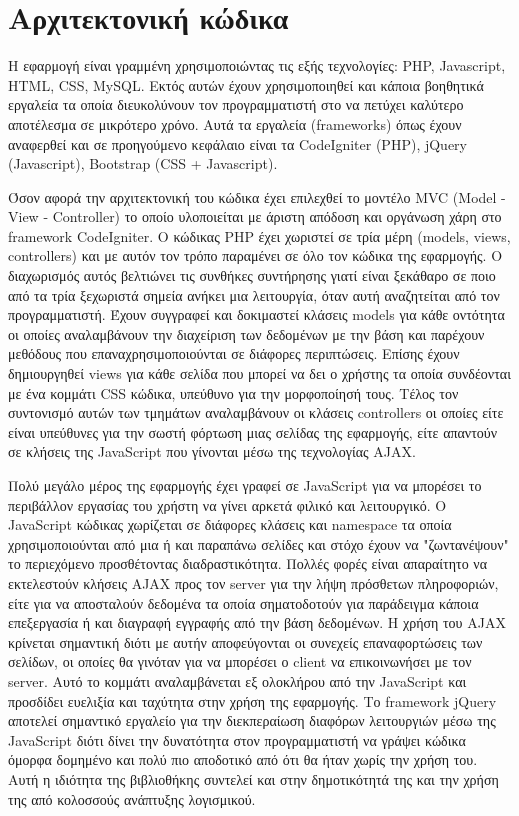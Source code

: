 

\section{Αρχιτεκτονική κώδικα}
Η εφαρμογή είναι γραμμένη χρησιμοποιώντας τις εξής τεχνολογίες: PHP, Javascript, HTML, CSS, MySQL. Εκτός αυτών έχουν χρησιμοποιηθεί και κάποια βοηθητικά εργαλεία τα οποία διευκολύνουν τον προγραμματιστή στο να πετύχει καλύτερο αποτέλεσμα σε μικρότερο χρόνο. Αυτά τα εργαλεία (frameworks) όπως έχουν αναφερθεί και σε προηγούμενο κεφάλαιο είναι τα CodeIgniter (PHP), jQuery (Javascript), Bootstrap (CSS + Javascript). 

Όσον αφορά την αρχιτεκτονική του κώδικα έχει επιλεχθεί το μοντέλο MVC (Model - View - Controller) το οποίο υλοποιείται με άριστη απόδοση και οργάνωση χάρη στο framework CodeIgniter. Ο κώδικας PHP έχει χωριστεί σε τρία μέρη (models, views, controllers) και με αυτόν τον τρόπο παραμένει σε όλο τον κώδικα της εφαρμογής. Ο διαχωρισμός αυτός βελτιώνει τις συνθήκες συντήρησης γιατί είναι ξεκάθαρο σε ποιο από τα τρία ξεχωριστά σημεία ανήκει μια λειτουργία, όταν αυτή αναζητείται από τον προγραμματιστή. Έχουν συγγραφεί και δοκιμαστεί κλάσεις models για κάθε οντότητα οι οποίες αναλαμβάνουν την διαχείριση των δεδομένων με την βάση και παρέχουν μεθόδους που επαναχρησιμοποιούνται σε διάφορες περιπτώσεις. Επίσης έχουν δημιουργηθεί views για κάθε σελίδα που μπορεί να δει ο χρήστης τα οποία συνδέονται με ένα κομμάτι CSS κώδικα, υπεύθυνο για την μορφοποίησή τους. Τέλος τον συντονισμό αυτών των τμημάτων αναλαμβάνουν οι κλάσεις controllers οι οποίες είτε είναι υπεύθυνες για την σωστή φόρτωση μιας σελίδας της εφαρμογής, είτε απαντούν σε κλήσεις της JavaScript που γίνονται μέσω της τεχνολογίας AJAX.

Πολύ μεγάλο μέρος της εφαρμογής έχει γραφεί σε JavaScript για να μπορέσει το περιβάλλον εργασίας του χρήστη να γίνει αρκετά φιλικό και λειτουργικό. Ο JavaScript κώδικας χωρίζεται σε διάφορες κλάσεις και namespace τα οποία χρησιμοποιούνται από μια ή και παραπάνω σελίδες και στόχο έχουν να "ζωντανέψουν" το περιεχόμενο προσθέτοντας διαδραστικότητα. Πολλές φορές είναι απαραίτητο να εκτελεστούν κλήσεις AJAX προς τον server για την λήψη πρόσθετων πληροφοριών, είτε για να αποσταλούν δεδομένα τα οποία σηματοδοτούν για παράδειγμα κάποια επεξεργασία ή και διαγραφή εγγραφής από την βάση δεδομένων. Η χρήση του AJAX κρίνεται σημαντική διότι με αυτήν αποφεύγονται οι συνεχείς επαναφορτώσεις των σελίδων, οι οποίες θα γινόταν για να μπορέσει ο client να επικοινωνήσει με τον server. Αυτό το κομμάτι αναλαμβάνεται εξ ολοκλήρου από την JavaScript και προσδίδει ευελιξία και ταχύτητα στην χρήση της εφαρμογής. Το framework jQuery αποτελεί σημαντικό εργαλείο για την διεκπεραίωση διαφόρων λειτουργιών μέσω της JavaScript διότι δίνει την δυνατότητα στον προγραμματιστή να γράψει κώδικα όμορφα δομημένο και πολύ πιο αποδοτικό από ότι θα ήταν χωρίς την χρήση του. Αυτή η ιδιότητα της βιβλιοθήκης συντελεί και στην δημοτικότητά της και την χρήση της από κολοσσούς ανάπτυξης λογισμικού.

